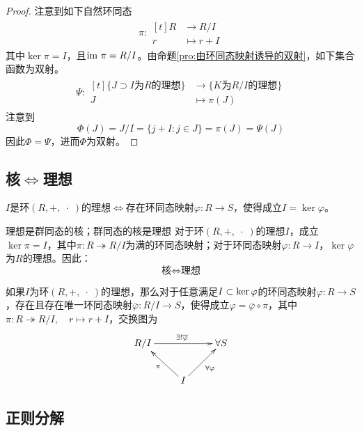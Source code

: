 \begin{proof}
	注意到如下自然环同态
	\begin{align*}
		\pi:\begin{aligned}[t]
			R&\longrightarrow R/I\\
			r&\longmapsto r+I
		\end{aligned}
	\end{align*}
	其中$\ker\pi=I$，且$\text{im } \pi=R/I$。由命题\ref{pro:由环同态映射诱导的双射}，如下集合函数为双射。
	\begin{align*}
		\Psi:\begin{aligned}[t]
			\{ J\supset I\text{为}R\text{的理想} \}&\longrightarrow \{ K\text{为}R/I\text{的理想} \}\\
			J&\longmapsto \pi(J)
		\end{aligned}
	\end{align*}
	注意到
	$$
	\Phi(J)=J/I=\{ j+I:j\in J \}=\pi(J)=\Psi(J)
	$$
	因此$\Phi=\Psi$，进而$\Phi$为双射。
\end{proof}

\subsection{核$\iff$理想}

\begin{theorem}
	$I$是环$(R,+,\;\cdot\;)$的理想$\iff $存在环同态映射$\varphi:R\to S$，使得成立$I=\ker\varphi$。
\end{theorem}

\begin{theorem}{理想是群同态的核；群同态的核是理想}
	对于环$(R,+,\;\cdot\;)$的理想$I$，成立$\ker\pi=I$，其中$\pi:R\twoheadrightarrow R/I$为满的环同态映射；对于环同态映射$\varphi:R\to I$，$\ker\varphi$为$R$的理想。因此：
	$$
	\text{核}\iff\text{理想}
	$$
\end{theorem}

\begin{theorem}
	如果$I$为环$(R,+,\;\cdot\;)$的理想，那么对于任意满足$I\subset\ker\varphi$的环同态映射$\varphi:R\to S$，存在且存在唯一环同态映射$\overline{\varphi}:R/I\to S$，使得成立$\varphi=\overline{\varphi}\circ\pi$，其中$\pi:R\twoheadrightarrow R/I,\quad r\mapsto r+I$，交换图为
	$$
	\xymatrix{
		R/I \ar^{\exists!\overline{\varphi}}[rr]& &\forall S\\
		& I \ar[ul]^{\pi} \ar[ur]_{\forall\varphi} &
	}
	$$
\end{theorem}

\subsection{正则分解}

